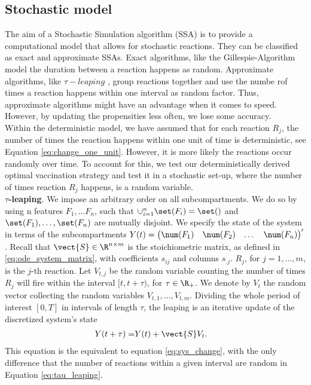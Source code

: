 \subsection{Stochastic model}
\label{sec:stochastic}


The aim of a Stochastic Simulation algorithm (SSA) is to provide a computational model that allows for stochastic reactions. They can be classified as exact and approximate SSAs. Exact algorithms, like the Gillespie-Algorithm \citep{Gillespie.1977} model the duration between a reaction happens as random. Approximate algorithms, like $\tau-leaping$ \citep{Gillespie.2001}, group reactions together and use the numbe rof times a reaction happens within one interval as random factor. Thus, approximate algorithms might have an advantage when it comes to speed. However, by updating the propensities less often, we lose some accuracy.\\ %

Within the deterministic model, we have assumed that for each reaction $R_j$, the number of times the reaction happens within one unit of time is deterministic, see Equation \eqref{eq:change_one_unit}. However, it is more likely the reactions occur randomly over time. To account for this, we test our deterministically derived optimal vaccination strategy and test it in a stochastic set-up, where the number of times reaction $R_j$ happens, is a random variable.  \\

\textbf{$\tau$-leaping}. We impose an arbitrary order on all subcompartments. We do so by using n features $F_1, \dots F_n$, such that $\cup_{i=1}^n \set(F_i) = \set()$ and $\set(F_1), \dots, \set(F_n)$ are mutually disjoint. We specify the state of the system in terms of the subcompartments $Y(t) = \begin{pmatrix} \num(F_1) & \num(F_2) & \dots & \num(F_n)\end{pmatrix}'$. Recall that $\vect{S} \in \R^{n \times m}$ is the stoichiometric matrix, as defined in \eqref{eq:ode_system_matrix}, with coefficients $s_{ij}$ and columns $s_{.j}$. $R_j$, for $j=1, \dots, m$, is the $j$-th reaction. Let $V_{t,j}$ be the random variable counting the number of times $R_j$ will fire within the interval $[t, t + \tau)$, for $\tau \in \R_+$. We denote by $V_t$ the random vector collecting the random variables $V_{t,1}, \hdots, V_{t,m}$. Dividing the whole period of interest $[0, T]$ in intervals of length $\tau$, the leaping is an iterative update of the discretized system's state
\begin{align}
\label{eq:tau_leaping}
Y(t + \tau) =& Y(t) + \vect{S} V_t.
\end{align}
This equation is the equivalent to equation \eqref{eq:sys_change}, with the only difference that the number of reactions within a given interval are random in Equation \eqref{eq:tau_leaping}. \\

